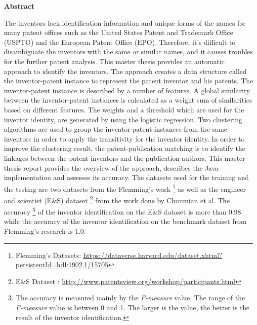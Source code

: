 \thispagestyle{empty}

\centerline{\Large{\textbf{Abstract}}}

\vspace{2cm}
The inventors lack identification information and unique forms of the names for many patent offices such as the United States Patent and Trademark Office (USPTO) and the European Patent Office (EPO). Therefore, it's difficult to disambiguate the inventors with the same or similar names, and it causes troubles for the further patent analysis. This master thesis provides an automatic approach to identify the inventors. The approach creates a data structure called the inventor-patent instance to represent the patent inventor and his patents. The inventor-patent instance is described by a number of features. A global similarity between the inventor-patent instances is calculated as a weight sum of similarities based on different features. The weights and a threshold which are used for the inventor identity, are generated by using the logistic regression. Two clustering algorithms are used to group the inventor-patent instances from the same inventors in order to apply the transitivity for the inventor identity. In order to improve the clustering result, the patent-publication matching is to identify the linkages between the patent inventors and the publication authors. This master thesis report provides  the overview of the approach, describes the Java implementation and assesses its accuracy. The datasets used for the training and the testing  are two datasets from the Flemming's work \footnote{Flemming's Datasets: \url{https://dataverse.harvard.edu/dataset.xhtml? persistentId=hdl:1902.1/15705}} as well as the engineer and scientist (E\&S) dataset \footnote{E\&S Dataset : \url{http://www.patentsview.org/workshop/participants.html}} from the work done by Chunmian et al. The accuracy \footnote{The accuracy is measured mainly by the \emph{F-measure} value. The range of the \emph{F-measure} value is between 0 and 1. The larger is the value, the better is the result of the inventor identification. } of the inventor identification on the E\&S dataset is more than 0.98 while the accuracy of the inventor identification on the benchmark dataset from Flemming's research is 1.0.



